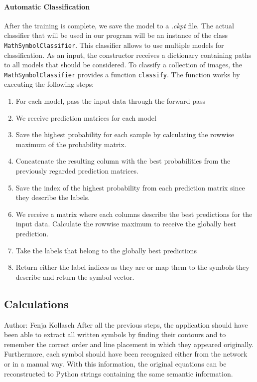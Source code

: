\documentclass[11pt]{article}
\begin{document}
	\paragraph{Automatic Classification}
	After the training is complete, we save the model to a \textit{.ckpt} file. The actual classifier that will be used in our program will be an instance of the class \texttt{MathSymbolClassifier}. This classifier allows to use multiple models for classification. As an input, the constructor receives a dictionary containing paths to all models that should be considered. To classify a collection of images, the \texttt{MathSymbolClassifier} provides a function \texttt{classify}. The function works by executing the following steps:
	\begin{enumerate}
		\item For each model, pass the input data through the forward pass
		\item We receive prediction matrices for each model
		\item Save the highest probability for each sample by calculating the rowwise maximum of the probability matrix.
		\item Concatenate the resulting column with the best probabilities from the previously regarded prediction matrices.
		\item Save the index of the highest probability from each prediction matrix since they describe the labels.
		\item We receive a matrix where each columns describe the best predictions for the input data. Calculate the rowwise maximum to receive the globally best prediction.
		\item Take the labels that belong to the globally best predictions
		\item Return either the label indices as they are or map them to the symbols they describe and return the symbol vector.
	\end{enumerate}
	
	\subsection{Calculations}
	\small{Author: Fenja Kollasch} \newline \newline
	After all the previous steps, the application should have been able to extract all written symbols by finding their contours and to remember the correct order and line placement in which they appeared originally. Furthermore, each symbol should have been recognized either from the network or in a manual way. With this information, the original equations can be reconstructed to Python strings containing the same semantic information.
	
\end{document}
